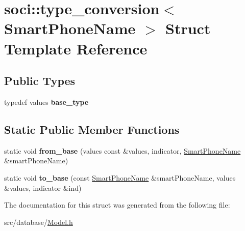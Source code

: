 \hypertarget{structsoci_1_1type__conversion_3_01_smart_phone_name_01_4}{\section{soci\-:\-:type\-\_\-conversion$<$ Smart\-Phone\-Name $>$ Struct Template Reference}
\label{structsoci_1_1type__conversion_3_01_smart_phone_name_01_4}
}
\subsection*{Public Types}
\begin{DoxyCompactItemize}
\item 
\hypertarget{structsoci_1_1type__conversion_3_01_smart_phone_name_01_4_a8442348b79ace6be30a070ab4d56ab14}{typedef values {\bfseries base\-\_\-type}}\label{structsoci_1_1type__conversion_3_01_smart_phone_name_01_4_a8442348b79ace6be30a070ab4d56ab14}

\end{DoxyCompactItemize}
\subsection*{Static Public Member Functions}
\begin{DoxyCompactItemize}
\item 
\hypertarget{structsoci_1_1type__conversion_3_01_smart_phone_name_01_4_a6744301f3d8fcb2b727d2e48f17a5098}{static void {\bfseries from\-\_\-base} (values const \&values, indicator, \hyperlink{struct_smart_phone_name}{Smart\-Phone\-Name} \&smart\-Phone\-Name)}\label{structsoci_1_1type__conversion_3_01_smart_phone_name_01_4_a6744301f3d8fcb2b727d2e48f17a5098}

\item 
\hypertarget{structsoci_1_1type__conversion_3_01_smart_phone_name_01_4_aa96352aeef84262bd4fb7502da88aad0}{static void {\bfseries to\-\_\-base} (const \hyperlink{struct_smart_phone_name}{Smart\-Phone\-Name} \&smart\-Phone\-Name, values \&values, indicator \&ind)}\label{structsoci_1_1type__conversion_3_01_smart_phone_name_01_4_aa96352aeef84262bd4fb7502da88aad0}

\end{DoxyCompactItemize}


The documentation for this struct was generated from the following file\-:\begin{DoxyCompactItemize}
\item 
src/database/\hyperlink{_model_8h}{Model.\-h}\end{DoxyCompactItemize}
